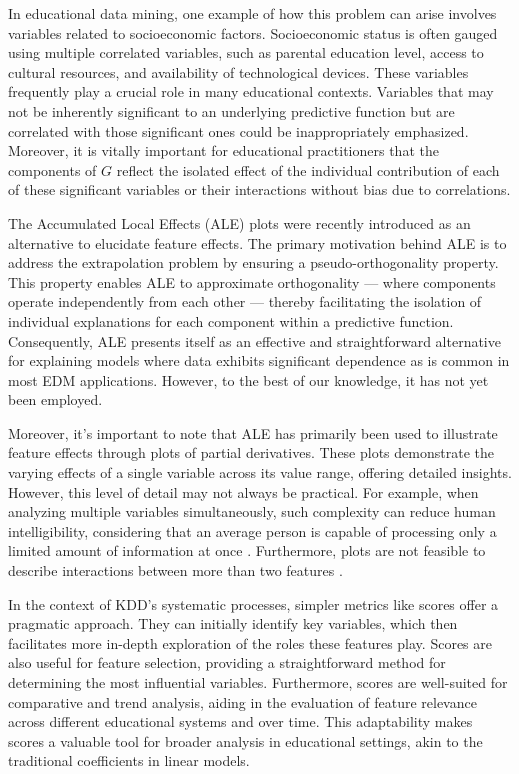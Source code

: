 In educational data mining, one example of how this problem can arise involves variables related to socioeconomic factors. Socioeconomic status is often gauged using multiple correlated variables, such as parental education level, access to cultural resources, and availability of technological devices. These variables frequently play a crucial role in many educational contexts. Variables that may not be inherently significant to an underlying predictive function but are correlated with those significant ones could be inappropriately emphasized. Moreover, it is vitally important for educational practitioners that the components of  \(G\) reflect the isolated effect of the individual contribution of each of these significant variables or their interactions without bias due to correlations.

The Accumulated Local Effects (ALE) plots \cite{Apley2020VisualizingModels} were recently introduced as an alternative to elucidate feature effects. The primary motivation behind ALE is to address the extrapolation problem by ensuring a pseudo-orthogonality property. This property enables ALE to approximate orthogonality — where components operate independently from each other — thereby facilitating the isolation of individual explanations for each component within a predictive function. Consequently, ALE presents itself as an effective and straightforward alternative for explaining models where data exhibits significant dependence as is common in most EDM applications. However, to the best of our knowledge, it has not yet been employed. 

Moreover, it's important to note that ALE has primarily been used to illustrate feature effects through plots of partial derivatives. These plots demonstrate the varying effects of a single variable across its value range, offering detailed insights. However, this level of detail may not always be practical. For example, when analyzing multiple variables simultaneously, such complexity can reduce human intelligibility, considering that an average person is capable of processing only a limited amount of information at once \cite{Miller1956TheInformation.}. Furthermore, plots are not feasible to describe interactions between more than two features \cite{Apley2020VisualizingModels}.

In the context of KDD's systematic processes, simpler metrics like scores offer a pragmatic approach. They can initially identify key variables, which then facilitates more in-depth exploration of the roles these features play. Scores are also useful for feature selection, providing a straightforward method for determining the most influential variables. Furthermore, scores are well-suited for comparative and trend analysis, aiding in the evaluation of feature relevance across different educational systems and over time. This adaptability makes scores a valuable tool for broader analysis in educational settings, akin to the traditional coefficients in linear models.


